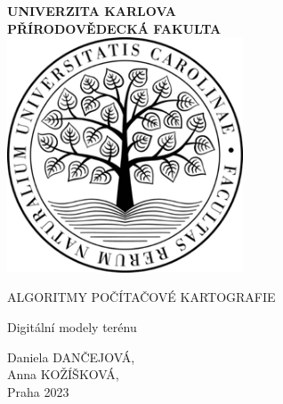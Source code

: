 \documentclass[11pt, a4paper]{report}
\begin{document}
\begin{titlepage}
    \centering
        {\bfseries\Large
            UNIVERZITA KARLOVA\\
            PŘÍRODOVĚDECKÁ FAKULTA\\
            \vskip2cm
        } 
        \vfill
             \includegraphics[width=7cm]{logo_natur} %
        \vfill
        {\bfseries\Large
            \vskip2cm
            {\Large ALGORITMY POČÍTAČOVÉ KARTOGRAFIE\par}
            \vskip0.3cm
            Digitální modely terénu\\
            \vskip4.5cm
        }
\vfill
    {\large\raggedleft Daniela DANČEJOVÁ, \\Anna KOŽÍŠKOVÁ, \\Praha 2023\par} 
\vfill
\vfill
\end{titlepage}







\end{document}
